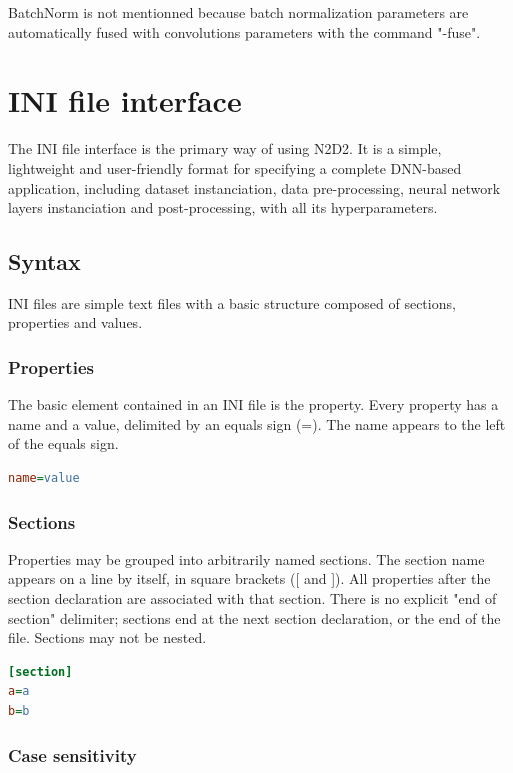 \documentclass[a4paper,11pt,oneside]{article}
\begin{document}
BatchNorm is not mentionned because batch normalization parameters are automatically fused with convolutions parameters with the command "-fuse". 
\clearpage

\section{INI file interface}

The INI file interface is the primary way of using N2D2. It is a simple,
lightweight and user-friendly format for specifying a complete DNN-based
application, including dataset instanciation, data pre-processing, neural
network layers instanciation and post-processing, with all its hyperparameters.

\subsection{Syntax}

INI files are simple text files with a basic structure composed of sections,
properties and values.

\subsubsection{Properties}

The basic element contained in an INI file is the property. Every property has
a name and a value, delimited by an equals sign (=). The name appears to the
left of the equals sign.

\begin{lstlisting}[language=ini]
name=value
\end{lstlisting}

\subsubsection{Sections}

Properties may be grouped into arbitrarily named sections. The section name
appears on a line by itself, in square brackets ([ and ]). All properties after
the section declaration are associated with that section. There is no explicit
"end of section" delimiter; sections end at the next section declaration, or the
end of the file. Sections may not be nested.

\begin{lstlisting}[language=ini]
[section]
a=a
b=b
\end{lstlisting}

\subsubsection{Case sensitivity}
\end{document}
